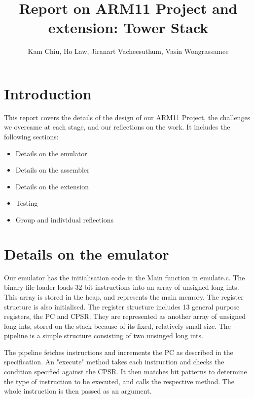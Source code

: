 \documentclass[11pt]{article}
\begin{document}
\title{Report on ARM11 Project and extension: Tower Stack}
\author{Kam Chiu, Ho Law, Jiranart Vacheesuthum, Vasin Wongrassamee}

\maketitle

\section{Introduction}

This report covers the details of the design of our ARM11 Project, the challenges we overcame at each stage, and our reflections on the work. It includes the following sections:

\begin{itemize}
  \item Details on the emulator
  \item Details on the assembler
  \item Details on the extension
  \item Testing
  \item Group and individual reflections
\end{itemize}

\section{Details on the emulator}

Our emulator has the initialisation code in the Main function in emulate.c. The binary file loader loads 32 bit instructions into an array of unsigned long ints. This array is stored in the heap, and represents the main memory. The register structure is also initialised. The register structure includes 13 general purpose registers, the PC and CPSR. They are represented as another array of unsigned long ints, stored on the stack because of its fixed, relatively small size. The pipeline is a simple structure consisting of two unsinged long ints.

\medskip

The pipeline fetches instructions and increments the PC as described in the specification. An "execute" method takes each instruction and checks the condition specified against the CPSR. It then matches bit patterns to determine the type of instruction to be executed, and calls the respective method. The whole instruction is then passed as an argument. 
\end{document}
